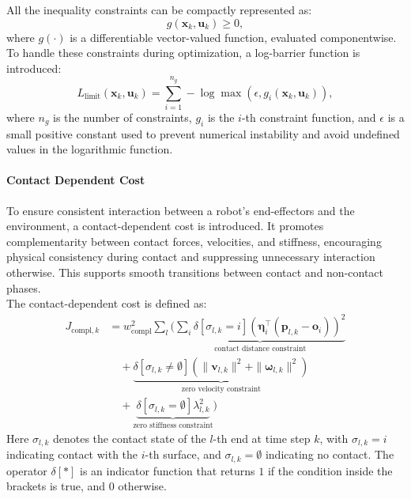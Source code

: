 \documentclass[main.tex]{subfiles}
\begin{document}
\begin{sloppypar}
All the inequality constraints can be compactly represented as:
\begin{equation}
g(\mathbf{x}_k, \mathbf{u}_k) \geq 0,
\end{equation}
where $g(\cdot)$ is a differentiable vector-valued function, evaluated componentwise. To handle these constraints during optimization, a log-barrier function is introduced:
\begin{equation}
L_{\text{limit}}(\mathbf{x}_k, \mathbf{u}_k) = \sum_{i=1}^{n_g} -\log \max(\epsilon, g_i(\mathbf{x}_k, \mathbf{u}_k)),
\end{equation}
where $n_g$ is the number of constraints, $g_i$ is the $i$-th constraint function, and $\epsilon$ is a small positive constant used to prevent numerical instability and avoid undefined values in the logarithmic function.
\paragraph{Contact Dependent Cost} 
To ensure consistent interaction between a robot’s end-effectors and the environment, a contact-dependent cost is introduced. It promotes complementarity between contact forces, velocities, and stiffness, encouraging physical consistency during contact and suppressing unnecessary interaction otherwise. This supports smooth transitions between contact and non-contact phases.\\
\newpage
The contact-dependent cost is defined as:
\begin{equation}
\label{eq:compl_cost}
\begin{aligned}
    J_{\text{compl},k} 
    &= w_{\text{compl}}^2 \sum_l \Bigg(
    \underbrace{ \sum_i \delta\left[\sigma_{l,k} = i\right] \left( \boldsymbol{\eta}_i^\top (\mathbf{p}_{l,k} - \mathbf{o}_i) \right)^2 }_{\text{contact distance constraint}} \\
    &\quad + \underbrace{ \delta\left[\sigma_{l,k} \neq \emptyset\right] \left( \| \mathbf{v}_{l,k} \|^2 + \| \boldsymbol{\omega}_{l,k} \|^2 \right) }_{\text{zero velocity constraint}} \\
    &\quad + \underbrace{ \delta\left[\sigma_{l,k} = \emptyset\right] \lambda_{l,k}^2 }_{\text{zero stiffness constraint}}
    \Bigg)
\end{aligned}
\end{equation}
Here $\sigma_{l,k}$ denotes the contact state of the $l$-th end at time step $k$, with $\sigma_{l,k} = i$ indicating contact with the $i$-th surface, and $\sigma_{l,k} = \emptyset$ indicating no contact. The operator $\delta[\ast]$ is an indicator function that returns $1$ if the condition inside the brackets is true, and $0$ otherwise.\\

\end{sloppypar}
\end{document}
